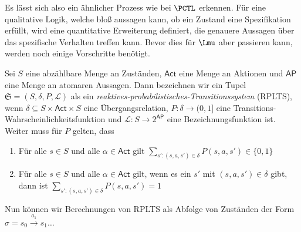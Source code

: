 Es lässt sich also ein ähnlicher Prozess wie bei $\PCTL$ erkennen.
Für eine qualitative Logik, welche bloß aussagen kann, ob ein Zustand eine Spezifikation erfüllt, wird eine quantitative Erweiterung definiert, die genauere Aussagen über das spezifische Verhalten treffen kann.
Bevor dies für $\Lmu$ aber passieren kann, werden noch einige Vorschritte benötigt.
\begin{definition}
	Sei $S$ eine abzählbare Menge an Zuständen, $\mathsf{Act}$ eine Menge an Aktionen und $\mathsf{AP}$ eine Menge an atomaren Aussagen.
	Dann bezeichnen wir ein Tupel $\mathfrak{S}=(S,\delta,P,\mathcal{L})$ als ein \textit{reaktives-probabilistisches-Transitionssystem} (RPLTS), wenn $\delta\subseteq S\times \mathsf{Act} \times S$ eine Übergangsrelation, $P:\delta\to (0,1]$ eine Transitions-Wahrscheinlichkeitsfunktion und $\mathcal{L}:S\to2^{\mathsf{AP}}$ eine Bezeichnungsfunktion ist.
	Weiter muss für $P$ gelten, dass
	\begin{enumerate}
		\item Für alle $s\in S$ und alle $\alpha\in \mathsf{Act}$ gilt $\sum_{s' : (s,a,s')\in \delta} P(s,a,s')\in \{0,1\}$
		\item Für alle $s\in S$ und alle $\alpha\in \mathsf{Act}$ gilt, wenn es ein $s'$ mit $(s,a,s')\in \delta$ gibt, dann ist $\sum_{s' : (s,a,s')\in \delta} P(s,a,s') = 1$ \cite{stirling1991local}
	\end{enumerate}
\end{definition}

Nun können wir Berechnungen von RPLTS als Abfolge von Zuständen der Form $\sigma = s_0\xrightarrow{a_1}s_1 \dots $













